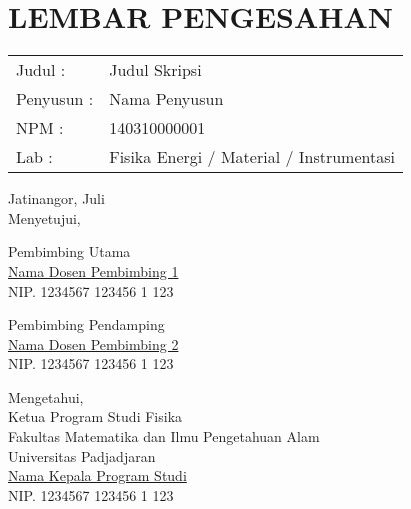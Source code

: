\chapter*{\centering LEMBAR PENGESAHAN}

\thispagestyle{empty}

\noindent \begin{tabular}{p{3cm}p{9.5cm}}
Judul \hspace{1.5cm}:&  Judul Skripsi\\
Penyusun \hspace{0.85cm}:&  Nama Penyusun\\
NPM \hspace{1.55cm}:&  140310000001 \\
Lab \hspace{1.80cm}:&  Fisika Energi / Material / Instrumentasi \\
\end{tabular}

\vspace{1cm}

\begin{center}
Jatinangor, Juli \the\year{}\\
Menyetujui, \\
\begin{multicols}{2}
	{Pembimbing Utama\\
	\vspace{2.75cm}
	\underline{Nama Dosen Pembimbing 1} \\
	NIP. 1234567 123456 1 123\\}

	{Pembimbing Pendamping\\
	\vspace{2.75cm}
	\underline{Nama Dosen Pembimbing 2} \\
	NIP. 1234567 123456 1 123\\}
\end{multicols}

\vspace{1cm}

Mengetahui, \\
Ketua Program Studi Fisika \\
Fakultas Matematika dan Ilmu Pengetahuan Alam \\
Universitas Padjadjaran \\
\vspace{2.75cm}
\underline{ Nama Kepala Program Studi } \\
NIP. 1234567 123456 1 123 \\
\end{center}
